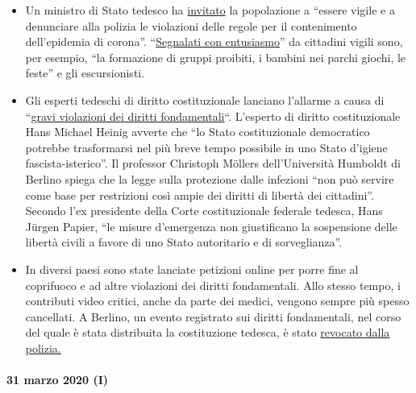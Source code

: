 \begin{itemize}
\tightlist
\item
  Un ministro di Stato tedesco ha
  \href{https://de.nachrichten.yahoo.com/strobl-b\%C3\%BCrger-verst\%C3\%B6\%C3\%9Fe-gegen-corona-regeln-polizei-melden-095746341.html}{invitato}
  la popolazione a ``essere vigile e a denunciare alla polizia le
  violazioni delle regole per il contenimento dell'epidemia di corona''.
  ``\href{https://www.br.de/nachrichten/bayern/buerger-melden-eifrig-verstoesse-gegen-corona-regeln,RuGXp1h}{Segnalati
  con entusiasmo}'' da cittadini vigili sono, per esempio, ``la
  formazione di gruppi proibiti, i bambini nei parchi giochi, le feste''
  e gli escursionisti. 
\item
  Gli esperti tedeschi di diritto costituzionale lanciano l'allarme a
  causa di
  ``\href{https://www.focus.de/politik/deutschland/corona-regelungen-der-regierung-medizin-darf-nicht-gefaehrlicher-sein-als-die-krankheit_id_11827625.html}{gravi
  violazioni dei diritti fondamentali}``. L'esperto di diritto
  costituzionale Hans Michael Heinig avverte che ``lo Stato
  costituzionale democratico potrebbe trasformarsi nel più breve tempo
  possibile in uno Stato d'igiene fascista-isterico''. Il professor
  Christoph Möllers dell'Università Humboldt di Berlino spiega che la
  legge sulla protezione dalle infezioni ``non può servire come base per
  restrizioni così ampie dei diritti di libertà dei cittadini''. Secondo
  l'ex presidente della Corte costituzionale federale tedesca, Hans
  Jürgen Papier, ``le misure d'emergenza non giustificano la sospensione
  delle libertà civili a favore di uno Stato autoritario e di
  sorveglianza''.
\item
  In diversi paesi sono state lanciate petizioni online per porre fine
  al coprifuoco e ad altre violazioni dei diritti fondamentali. Allo
  stesso tempo, i contributi video critici, anche da parte dei medici,
  vengono sempre più spesso cancellati. A Berlino, un evento registrato
  sui diritti fondamentali, nel corso del quale è stata distribuita la
  costituzione tedesca, è stato
  \href{https://www.heise.de/tp/features/Wenn-Demonstranten-zu-Gefaehrdern-erklaert-werden-4692869.html}{revocato
  dalla polizia.}
\end{itemize}

\hypertarget{31-marzo-2020-i}{%
\paragraph{31 marzo 2020 (I)}\label{31-marzo-2020-i}}

